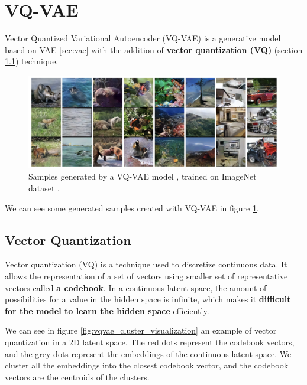 \section{VQ-VAE}
\label{vqvae}

Vector Quantized Variational Autoencoder (VQ-VAE) \cite{vqvae} is a generative model based on VAE \ref{sec:vae} with the addition of \textbf{vector quantization (VQ)} (section \ref{vq}) technique. 

\begin{figure}[h]
    \centering
    \includegraphics[width=\textwidth]{images/vqvae_samples.png}
    \caption{Samples generated by a VQ-VAE model \cite{vqvae}, trained on ImageNet dataset \cite{vqvae}.}
    \label{fig:vqvae_samples}
\end{figure}

We can see some generated samples created with VQ-VAE in figure \ref{fig:vqvae_samples}.








\subsection{Vector Quantization}
\label{vq}

Vector quantization (VQ) is a technique used to discretize continuous data. It allows the representation of a set of vectors using smaller set of representative vectors called \textbf{a codebook}. In a continuous latent space, the amount of possibilities for a value in the hidden space is infinite, which makes it \textbf{difficult for the model to learn the hidden space} efficiently.

We can see in figure \ref{fig:vqvae_cluster_visualization} an example of vector quantization in a 2D latent space. The red dots represent the codebook vectors, and the grey dots represent the embeddings of the continuous latent space. We cluster all the embeddings into the closest codebook vector, and the codebook vectors are the centroids of the clusters.

